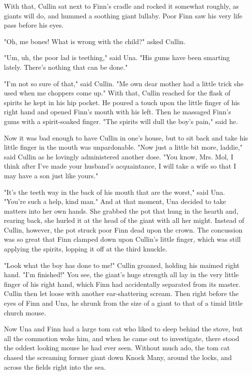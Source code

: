 With that, Cullin sat next to Finn's cradle and rocked it somewhat roughly, as giants will do, and hummed a soothing giant lullaby. Poor Finn saw his very life pass before his eyes.

"Oh, me bones! What is wrong with the child?" asked Cullin.

"Um, uh, the poor lad is teething," said Una. "His gums have been smarting lately. There's nothing that can be done."

"I'm not so sure of that," said Cullin. "Me own dear mother had a little trick she used when me choppers come up." With that, Cullin reached for the flask of spirits he kept in his hip pocket. He poured a touch upon the little finger of his right hand and opened Finn's mouth with his left. Then he massaged Finn's gums with a spirit-soaked finger. "The spirits will dull the boy's pain," said he.

Now it was bad enough to have Cullin in one's house, but to sit back and take his little finger in the mouth was unpardonable. "Now just a little bit more, laddie," said Cullin as he lovingly administered another dose. "You know, Mrs. Mol, I think after I've made your husband's acquaintance, I will take a wife so that I may have a son just like yours."

"It's the teeth way in the back of his mouth that are the worst," said Una. "You're such a help, kind man." And at that moment, Una decided to take matters into her own hands. She grabbed the pot that hung in the hearth and, rearing back, she hurled it at the head of the giant with all her might. Instead of Cullin, however, the pot struck poor Finn dead upon the crown. The concussion was so great that Finn clamped down upon Cullin's little finger, which was still applying the spirits, lopping it off at the third knuckle.

"Look what the boy has done to me!" Cullin groaned, holding his maimed right hand. "I'm finished!" You see, the giant's huge strength all lay in the very little finger of his right hand, which Finn had accidentally separated from its master. Cullin then let loose with another ear-shattering scream. Then right before the eyes of Finn and Una, he shrunk from the size of a giant to that of a timid little church mouse.

Now Una and Finn had a large tom cat who liked to sleep behind the stove, but all the commotion woke him, and when he came out to investigate, there stood the oddest looking mouse he had ever seen. Without much ado, the tom cat chased the screaming former giant down Knock Many, around the locks, and across the fields right into the sea.

